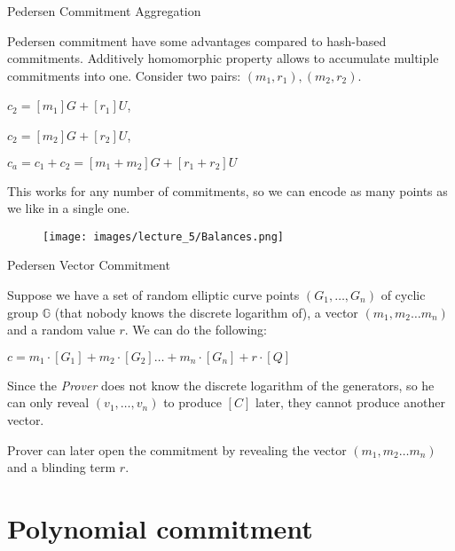 \documentclass[xcolor={usenames,dvipsnames}]{beamer}
\begin{document}
    \begin{frame}{Pedersen Commitment Aggregation}

        Pedersen commitment have some advantages compared to hash-based commitments.
        Additively homomorphic property allows to accumulate multiple commitments into one.
        Consider two pairs: $(m_1, r_1), (m_2, r_2)$.
        
        \begin{center}
            $c_2 = [m_1]G + [r_1]U$,
        
            $c_2 = [m_2]G + [r_2]U$,
        
            $c_a = c_1 + c_2 = [m_1 + m_2]G + [r_1 + r_2]U$
        \end{center}
        
        This works for any number of commitments, so we can encode as many points as we like in a single one.

        \begin{figure}
            \centering
            \texttt{[image: images/lecture\_5/Balances.png]}
        \end{figure}
        
\end{frame}

    \begin{frame}{Pedersen Vector Commitment}

        Suppose we have a set of random elliptic curve points $(G_1, \ldots ,G_n)$ of cyclic group $\mathbb{G}$ 
    (that nobody knows the discrete logarithm of), a vector $(m_1, m_2 \ldots m_n)$ and a random value $r$. We can do the following:

    \begin{center}
        $ c = m_1\cdot[G_1] + m_2 \cdot [G_2] \ldots + m_n \cdot [G_n] + r \cdot [Q]$ 
    \end{center}

    Since the \textit{Prover} does not know the discrete logarithm of the generators, so he can only reveal $(v_1, \ldots ,v_n)$ to produce $[C]$ later, they cannot produce another vector.

    Prover can later open the commitment by revealing the vector $(m_1, m_2 \ldots m_n)$ and a blinding term $r$.

            
    \end{frame}

    \section{Polynomial commitment}
\end{document}
